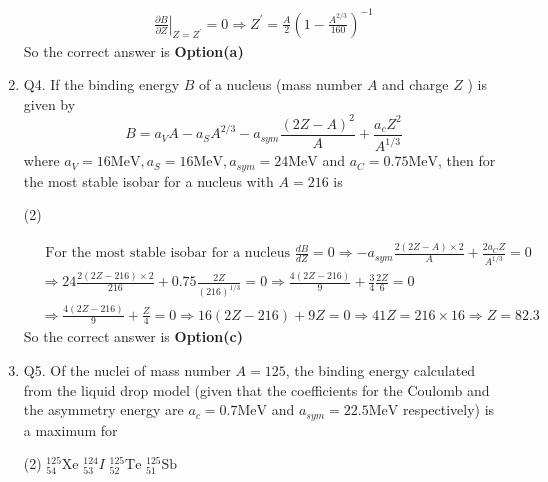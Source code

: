\begin{enumerate}
\begin{tasks}
	\end{tasks}
	\begin{answer}
		\begin{align*}
		\left.\frac{\partial B}{\partial Z}\right|_{Z=Z^{\prime}}=0 \Rightarrow Z^{\prime}=\frac{A}{2}\left(1-\frac{A^{2 / 3}}{160}\right)^{-1}
		\end{align*}
		So the correct answer is \textbf{Option(a)}
	\end{answer}
	\item Q4. If the binding energy $B$ of a nucleus (mass number $A$ and charge $Z$ ) is given by
	$$
	B=a_V A-a_S A^{2 / 3}-a_{s y m} \frac{(2 Z-A)^2}{A}+\frac{a_c Z^2}{A^{1 / 3}}
	$$
	where $a_V=16 \mathrm{MeV}, a_S=16 \mathrm{MeV}, a_{s y m}=24 \mathrm{MeV}$ and $a_C=0.75 \mathrm{MeV}$, then for the most stable isobar for a nucleus with $A=216$ is
	{}
	\begin{tasks}(2)
	\end{tasks}
	\begin{answer}
		\begin{align*}
		&\text{ For the most stable isobar for a nucleus }\frac{d B}{d Z}=0 \Rightarrow-a_{s y m} \frac{2(2 Z-A) \times 2}{A}+\frac{2 a_C Z}{A^{1 / 3}}=0\\
		&\Rightarrow 24 \frac{2(2 Z-216) \times 2}{216}+0.75 \frac{2 Z}{(216)^{1 / 3}}=0 \Rightarrow \frac{4(2 Z-216)}{9}+\frac{3}{4} \frac{2 Z}{6}=0 \\
		&\Rightarrow \frac{4(2 Z-216)}{9}+\frac{Z}{4}=0 \Rightarrow 16(2 Z-216)+9 Z=0 \Rightarrow 41 Z=216 \times 16 \Rightarrow Z=82.3
		\end{align*}
		So the correct answer is \textbf{Option(c)}
	\end{answer}
	\item Q5. Of the nuclei of mass number $A=125$, the binding energy calculated from the liquid drop model (given that the coefficients for the Coulomb and the asymmetry energy are $a_c=0.7 \mathrm{MeV}$ and $a_{s y m}=22.5 \mathrm{MeV}$ respectively) is a maximum for
	{}
	\begin{tasks}(2)
		\task[\textbf{a.}]${ }_{54}^{125} \mathrm{Xe}$
		\task[\textbf{b.}]${ }_{53}^{124} I$
		\task[\textbf{c.}]${ }_{52}^{125} \mathrm{Te}$
		\task[\textbf{d.}]  ${ }_{51}^{125} \mathrm{Sb}$
	\end{tasks}
	\begin{answer}
		\begin{align*}

\end{align*}
\end{answer}
\end{enumerate}
